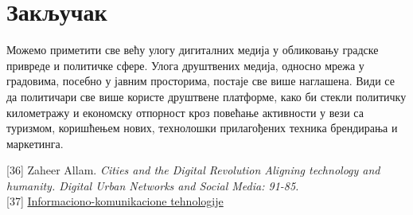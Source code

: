 \documentclass{article}
\begin{document}
\section{Закључак}
Можемо приметити све већу улогу дигиталних медија у
обликовању градске привреде и политичке сфере. Улога друштвених медија, односно мрежа у градовима, посебно у јавним просторима, постаје све више наглашена. Види се да политичари све више користе друштвене платформе, како би стекли политичку километражу и економску отпорност кроз повећање активности у вези са туризмом, коришћењем нових, технолошки прилагођених техника брендирања и маркетинга.

\newpage

 

\vspace{-7}
\bibitem{} [36] Zaheer Allam. \emph{Cities and the  Digital  Revolution Aligning technology and humanity. Digital Urban Networks and Social Media: 91-85.} \\

\vspace{-10}
\bibitem{} [37] \href{http://miticmirjana.weebly.com/104810501058-10901077109310851086108310861075108011121077.html}{Informaciono-komunikacione tehnologije}
\end{document}
